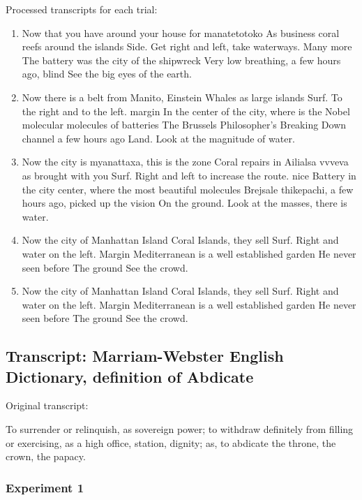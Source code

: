 \documentclass{article}
\begin{document}
Processed transcripts for each trial:

\begin{enumerate}
\item 
Now that you have around your house for manatetotoko
As business coral reefs around the islands
Side. Get right and left, take waterways. Many more
The battery was the city of the shipwreck
Very low breathing, a few hours ago, blind
See the big eyes of the earth.


\item 
Now there is a belt from Manito, Einstein
Whales as large islands
Surf. To the right and to the left. margin
In the center of the city, where is the Nobel molecular molecules of batteries
The Brussels Philosopher's Breaking Down channel a few hours ago
Land. Look at the magnitude of water.


\item 
Now the city is myanattaxa, this is the zone
Coral repairs in Ailialsa vvveva as brought with you
Surf. Right and left to increase the route. nice
Battery in the city center, where the most beautiful molecules
Brejsale thikepachi, a few hours ago, picked up the vision
On the ground. Look at the masses, there is water.


\item 
Now the city of Manhattan Island
Coral Islands, they sell
Surf. Right and water on the left. Margin
Mediterranean is a well established garden
He never seen before
The ground See the crowd.


\item 
Now the city of Manhattan Island
Coral Islands, they sell
Surf. Right and water on the left. Margin
Mediterranean is a well established garden
He never seen before
The ground See the crowd.

\end{enumerate}\subsection{Transcript: Marriam-Webster English Dictionary, definition of Abdicate}

Original transcript:

\begin{displayquote}
To surrender or relinquish, as sovereign power; to withdraw
definitely from filling or exercising, as a high office, station,
dignity; as, to abdicate the throne, the crown, the papacy.
\end{displayquote}\subsubsection{Experiment 1}
\end{document}
